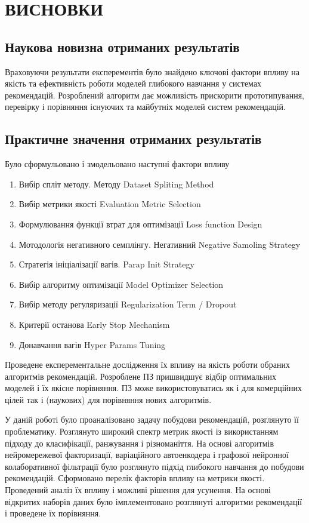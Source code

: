\newpage
\section{ВИСНОВКИ}
\subsection{Наукова новизна отриманих результатів}
Враховуючи результати експерементів було знайдено ключові фактори впливу на якість та ефективність роботи моделей  глибокого навчання у системах рекомендацій.
Розроблений алгоритм дає можливість прискорити прототипування, перевірку і порівняння існуючих та майбутніх моделей систем рекомендацій.
\subsection{Практичне значення отриманих результатів}
Було сформульовано і змодельовано наступні фактори впливу 
\begin{enumerate}
    \item Вибір спліт методу. Методу  Dataset Spliting Method
    \item Вибір метрики якості Evaluation Metric Selection
    \item Формулювання функції втрат для оптимізації Loss function Design
    \item Мотодологія негативного семплінгу. Негативний Negative Samoling Strategy
    \item Стратегія ініціалізації вагів. Parap Init Strategy
    \item Вибір алгоритму оптимізації Model Optimizer Selection 
    \item Вибір методу регуляризації Regularization Term /  Dropout
    \item Критерії останова Early Stop Mechanism
    \item Донавчання вагів Hyper Params Tuning
    \end{enumerate}
Проведене експерементальне дослідження їх впливу на якість роботи  обраних алгоритмів рекомендацій. 
Розроблене ПЗ пришвидшує відбір оптимальних моделей і їх якісне порівняння. ПЗ може використовуватись як і для комерційних цілей так і (наукових) для порівняння нових алгоритмів.

У даній роботі було проаналізовано задачу побудови рекомендацій, розглянуто її проблематику. Розглянуто широкий спектр метрик якості із використанням підходу до класифікації, ранжування і різноманіття.
На основі алгоритмів нейромережевої факторизації, варіаційного автоенкодера і графової нейронної колаборативної фільтрації було розглянуто підхід глибокого навчання до побудови рекомендацій.
Сформовано перелік факторів впливу на метрики якості. Проведений аналіз їх впливу і можливі рішення для усунення.
На основі відкритих наборів даних було імплементовано розглянуті алгоритми рекомендації і проведене їх порівняння.
